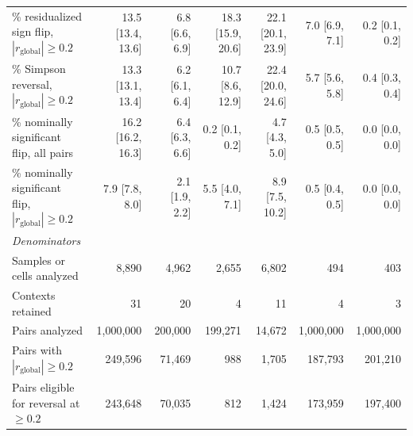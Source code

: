 \begin{tabular}{l*{6}{r}}
\% residualized sign flip, $|r_{\mathrm{global}}| \geq 0.2$ & 13.5 [13.4, 13.6] & 6.8 [6.6, 6.9] & 18.3 [15.9, 20.6] & 22.1 [20.1, 23.9] & 7.0 [6.9, 7.1] & 0.2 [0.1, 0.2] \\
\% Simpson reversal, $|r_{\mathrm{global}}| \geq 0.2$ & 13.3 [13.1, 13.4] & 6.2 [6.1, 6.4] & 10.7 [8.6, 12.9] & 22.4 [20.0, 24.6] & 5.7 [5.6, 5.8] & 0.4 [0.3, 0.4] \\
\% nominally significant flip, all pairs & 16.2 [16.2, 16.3] & 6.4 [6.3, 6.6] & 0.2 [0.1, 0.2] & 4.7 [4.3, 5.0] & 0.5 [0.5, 0.5] & 0.0 [0.0, 0.0] \\
\% nominally significant flip, $|r_{\mathrm{global}}| \geq 0.2$ & 7.9 [7.8, 8.0] & 2.1 [1.9, 2.2] & 5.5 [4.0, 7.1] & 8.9 [7.5, 10.2] & 0.5 [0.4, 0.5] & 0.0 [0.0, 0.0] \\
\midrule
\multicolumn{7}{l}{\textit{Denominators}} \\
Samples or cells analyzed & 8,890 & 4,962 & 2,655 & 6,802 & 494 & 403 \\
Contexts retained & 31 & 20 & 4 & 11 & 4 & 3 \\
Pairs analyzed & 1,000,000 & 200,000 & 199,271 & 14,672 & 1,000,000 & 1,000,000 \\
Pairs with $|r_{\mathrm{global}}| \geq 0.2$ & 249,596 & 71,469 & 988 & 1,705 & 187,793 & 201,210 \\
Pairs eligible for reversal at $\geq 0.2$ & 243,648 & 70,035 & 812 & 1,424 & 173,959 & 197,400 \\
\bottomrule
\end{tabular}
